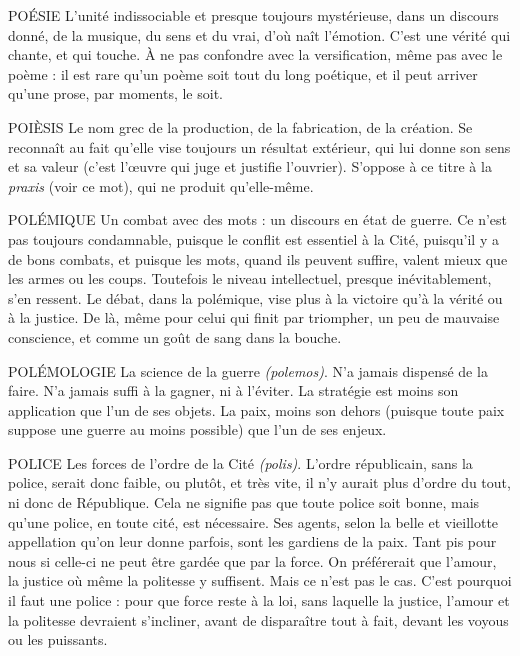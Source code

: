 POÉSIE L'unité indissociable et presque toujours mystérieuse, dans un discours
donné, de la musique, du sens et du vrai, d’où naît l'émotion.
C’est une vérité qui chante, et qui touche. À ne pas confondre avec la versification,
même pas avec le poème : il est rare qu’un poème soit tout du long poétique,
et il peut arriver qu’une prose, par moments, le soit.

POIÈSIS Le nom grec de la production, de la fabrication, de la création. Se
reconnaît au fait qu’elle vise toujours un résultat extérieur, qui lui
donne son sens et sa valeur (c’est l’œuvre qui juge et justifie l’ouvrier). S'oppose
à ce titre à la {\it praxis} (voir ce mot), qui ne produit qu’elle-même.

POLÉMIQUE Un combat avec des mots : un discours en état de guerre. Ce
n'est pas toujours condamnable, puisque le conflit est essentiel
à la Cité, puisqu'il y a de bons combats, et puisque les mots, quand ils peuvent
suffire, valent mieux que les armes ou les coups. Toutefois le niveau intellectuel,
presque inévitablement, s’en ressent. Le débat, dans la polémique, vise
plus à la victoire qu’à la vérité ou à la justice. De là, même pour celui qui finit
par triompher, un peu de mauvaise conscience, et comme un goût de sang dans
la bouche.

POLÉMOLOGIE La science de la guerre {\it (polemos)}. N’a jamais dispensé de
la faire. N'a jamais suffi à la gagner, ni à l’éviter. La stratégie
est moins son application que l’un de ses objets. La paix, moins son
dehors (puisque toute paix suppose une guerre au moins possible) que l’un de
ses enjeux.

POLICE Les forces de l’ordre de la Cité {\it (polis)}. L'ordre républicain, sans la
police, serait donc faible, ou plutôt, et très vite, il n’y aurait plus
d'ordre du tout, ni donc de République. Cela ne signifie pas que toute
police soit bonne, mais qu’une police, en toute cité, est nécessaire. Ses
agents, selon la belle et vieillotte appellation qu’on leur donne parfois, sont
les gardiens de la paix. Tant pis pour nous si celle-ci ne peut être gardée que
par la force. On préférerait que l'amour, la justice où même la politesse y
suffisent. Mais ce n’est pas le cas. C’est pourquoi il faut une police : pour
que force reste à la loi, sans laquelle la justice, l’amour et la politesse
devraient s’incliner, avant de disparaître tout à fait, devant les voyous ou les
puissants.

